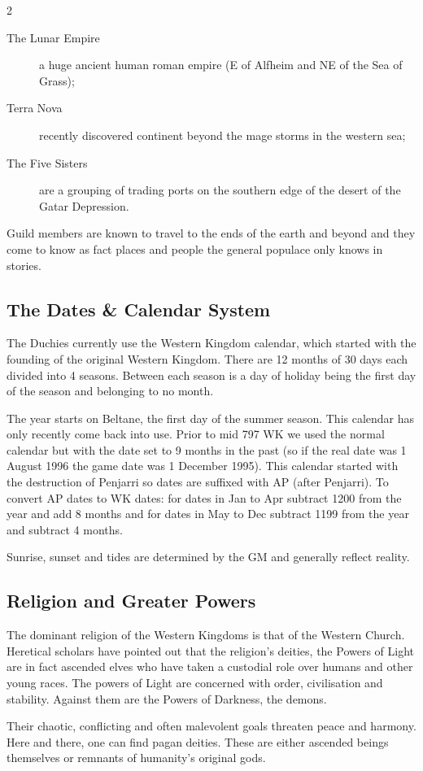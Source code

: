 \begin{multicols}{2}
\begin{description}
\item[The Lunar Empire] a huge ancient human roman empire (E of
  Alfheim and NE of the Sea of Grass);

\item[Terra Nova] recently discovered continent beyond the mage storms
  in the western sea;

\item[The Five Sisters] are a grouping of trading ports on the
  southern edge of the desert of the Gatar Depression.

\end{description}

Guild members are known to travel to the ends of the earth and beyond
and they come to know as fact places and people the general populace
only knows in stories.

\subsection{The Dates \& Calendar System}

The Duchies currently use the Western Kingdom calendar, which started
with the founding of the original Western Kingdom.  There are 12
months of 30 days each divided into 4 seasons. Between each season is
a day of holiday being the first day of the season and belonging to no
month.

The year starts on Beltane, the first day of the summer season.  This
calendar has only recently come back into use. Prior to mid 797 WK we
used the normal calendar but with the date set to 9 months in the past
(so if the real date was 1 August 1996 the game date was 1 December
1995). This calendar started with the destruction of Penjarri so dates
are suffixed with AP (after Penjarri). To convert AP dates to WK
dates: for dates in Jan to Apr subtract 1200 from the year and add 8
months and for dates in May to Dec subtract 1199 from the year and
subtract 4 months.

Sunrise, sunset and tides are determined by
the GM and generally reflect reality.

\subsection{Religion and Greater Powers}

The dominant religion of the Western Kingdoms is that of the Western
Church.  Heretical scholars have pointed out that the religion’s
deities, the Powers of Light are in fact ascended elves who have taken
a custodial role over humans and other young races. The powers of
Light are concerned with order, civilisation and stability. Against
them are the Powers of Darkness, the demons.

Their chaotic, conflicting and often malevolent goals threaten peace
and harmony. Here and there, one can find pagan deities. These are
either ascended beings themselves or remnants of humanity’s original
gods.
\end{multicols}
